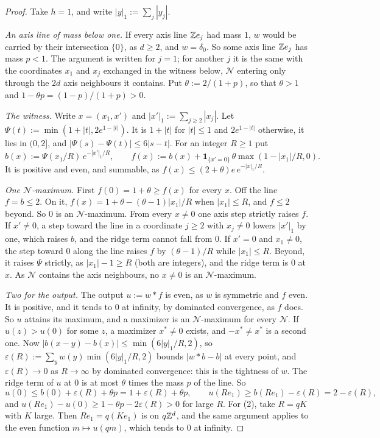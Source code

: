 \begin{proof}
Take $h = 1$, and write $|y|_1 := \sum_j|y_j|$.

\emph{An axis line of mass below one.} If every axis line $\mathbb{Z} e_j$ had mass $1$, $w$ would be
carried by their intersection $\{0\}$, as $d \ge 2$, and $w = \delta_0$. So some axis line
$\mathbb{Z} e_j$ has mass $p < 1$. The argument is written for $j = 1$; for another $j$ it is the same with
the coordinates $x_1$ and $x_j$ exchanged in the witness below, $\mathcal{N}$ entering only through
the $2d$ axis neighbours it contains. Put $\theta := 2/(1 + p)$, so that $\theta > 1$ and
$1 - \theta p = (1 - p)/(1 + p) > 0$.

\emph{The witness.} Write $x = (x_1, x')$ and $|x'|_1 := \sum_{j \ge 2}|x_j|$. Let
$\Psi(t) := \min(1 + |t|, 2e^{1 - |t|})$. It is $1 + |t|$ for $|t| \le 1$ and $2e^{1 - |t|}$
otherwise, it lies in $(0, 2]$, and $|\Psi(s) - \Psi(t)| \le 6|s - t|$. For an integer $R \ge 1$ put
\[
  b(x) := \Psi(x_1/R)\,e^{-|x'|_1/R}, \qquad
  f(x) := b(x) + \mathbf{1}_{\{x' = 0\}}\,\theta\max(1 - |x_1|/R, 0) .
\]
It is positive and even, and summable, as $f(x) \le (2 + \theta)e\,e^{-|x|_1/R}$.

\emph{One $\mathcal{N}$-maximum.} First $f(0) = 1 + \theta \ge f(x)$ for every $x$. Off the line
$f = b \le 2$. On it, $f(x) = 1 + \theta - (\theta - 1)|x_1|/R$ when $|x_1| \le R$, and $f \le 2$
beyond. So $0$ is an $\mathcal{N}$-maximum. From every $x \ne 0$ one axis step strictly raises $f$.
If $x' \ne 0$, a step toward the line in a coordinate $j \ge 2$ with $x_j \ne 0$ lowers $|x'|_1$ by
one, which raises $b$, and the ridge term cannot fall from $0$. If $x' = 0$ and $x_1 \ne 0$, the step
toward $0$ along the line raises $f$ by $(\theta - 1)/R$ while $|x_1| \le R$. Beyond, it raises $\Psi$
strictly, as $|x_1| - 1 \ge R$ (both are integers), and the ridge term is $0$ at $x$. As
$\mathcal{N}$ contains the axis neighbours, no $x \ne 0$ is an $\mathcal{N}$-maximum.

\emph{Two for the output.} The output $u := w * f$ is even, as $w$ is symmetric and $f$ even. It is
positive, and it tends to $0$ at infinity, by dominated convergence, as $f$ does. So $u$ attains its
maximum, and a maximizer is an $\mathcal{N}$-maximum for every $\mathcal{N}$. If $u(z) > u(0)$ for
some $z$, a maximizer $x^* \ne 0$ exists, and $-x^* \ne x^*$ is a second one. Now
$|b(x - y) - b(x)| \le \min(6|y|_1/R, 2)$, so
$\varepsilon(R) := \sum_yw(y)\min(6|y|_1/R, 2)$ bounds $|w * b - b|$ at every point, and
$\varepsilon(R) \to 0$ as $R \to \infty$ by dominated convergence: this is the tightness of $w$. The
ridge term of $u$ at $0$ is at most $\theta$ times the mass $p$ of the line. So
\[
  u(0) \le b(0) + \varepsilon(R) + \theta p = 1 + \varepsilon(R) + \theta p, \qquad
  u(Re_1) \ge b(Re_1) - \varepsilon(R) = 2 - \varepsilon(R),
\]
and $u(Re_1) - u(0) \ge 1 - \theta p - 2\varepsilon(R) > 0$ for large $R$. For (2), take $R = qK$
with $K$ large. Then $Re_1 = q(Ke_1)$ is on $q\mathbb{Z}^d$, and the same argument applies to the even
function $m \mapsto u(qm)$, which tends to $0$ at infinity.


\end{proof}
